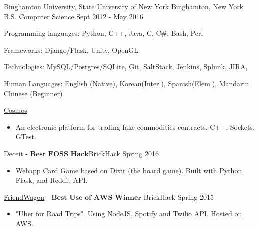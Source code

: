 \documentclass[11pt]{article}
\begin{document}
\spacedhrule{0.5em}{0.5em}  %

\headedsection
{\href{http://www.binghamton.edu/index.php}{Binghamton University, State University of New York}}
{Binghamton, New York} {
    \headedsubsection
    {B.S. Computer Science}
    {Sept 2012 - May 2016}
    {}
}

\nobreakvspace{0.5em}  %


\spacedhrule{0.5em}{0.5em}  %

\inlineskillsection  %
{Programming languages:}
{ Python, C++, Java, C, C\#, Bash, Perl }

\inlineskillsection  
{Frameworks:}
{ Django/Flask, Unity, OpenGL}

\inlineskillsection
{Technologies:}
{ MySQL/Postgres/SQLite, Git, SaltStack, Jenkins, Splunk, JIRA, \latex }

\inlineskillsection
{Human Languages:}
{English (Native), Korean(Inter.), Spanish(Elem.), Mandarin Chinese (Beginner)}


\nobreakvspace{0.3em}  %


\spacedhrule{0.1em}{0.5em}  %

\projects
{{\href{https://github.com/gabeochoa/Cosmos}{Cosmos}}}{}
{
    \begin{itemize}[label={}]
        \setlength\itemsep{.005ex}
        \item{An electronic platform for trading fake commodities contracts. C++, Sockets, GTest.}
    \end{itemize}
}

\projects
{{\href{https://github.com/gabeochoa/sokim}{Deceit}} - $\textbf{Best FOSS Hack}$}{BrickHack Spring 2016}
{
    \begin{itemize}[label={}]
        \setlength\itemsep{.005ex}
        \item{Webapp Card Game based on Dixit (the board game). Built with Python, Flask, and Reddit API.}
    \end{itemize}
}

\headedsubsection
{{\href{https://github.com/alanplotko/RoadTrip}{FriendWagon}} - $\textbf{Best Use of AWS Winner}$ }
{BrickHack Spring 2015}
{
    \begin{itemize}[label={}]
    	\setlength\itemsep{.005ex}
        \item{"Uber for Road Trips". Using NodeJS, Spotify and Twilio API. Hosted on AWS.}
    \end{itemize}
}
\end{document}
